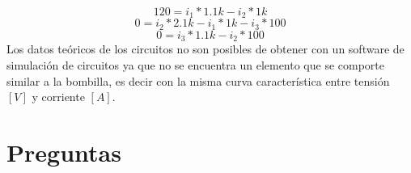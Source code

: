 \documentclass[twocolumn]{IEEEtran}
\begin{document}
\begin{equation}
 120 = i_1*1.1 k - i_2 * 1 k
\end{equation}
\begin{equation}
 0 = i_2 * 2.1 k - i_1 * 1 k - i_3 * 100
\end{equation}
\begin{equation}
 0 = i_3 * 1.1 k - i_2 * 100
\end{equation}
\noindent
Los datos teóricos de los circuitos no son posibles de obtener con un software de simulación de circuitos ya que no se encuentra un elemento que se comporte similar a la bombilla, es decir con la misma curva característica entre tensión $[V]$ y corriente $[A]$.

\section{Preguntas}
\end{document}
